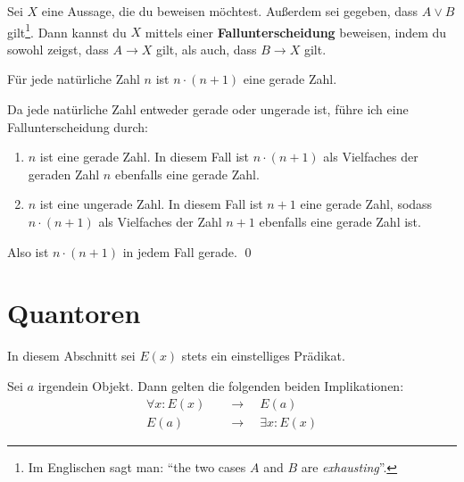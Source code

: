 \begin{axiom} \label{fallunterscheidung} 
    Sei $X$ eine Aussage, die du beweisen möchtest. Außerdem sei gegeben, dass $A\lor B$ gilt\footnote{Im Englischen sagt man: ``the two cases $A$ and $B$ are \emph{exhausting}''.}. Dann kannst du $X$ mittels einer \textbf{Fallunterscheidung} beweisen, indem du sowohl zeigst, dass $A\to X$ gilt, als auch, dass $B\to X$ gilt.
\end{axiom}


\begin{bsp} \label{bsp:fallunterscheidung}
    Für jede natürliche Zahl $n$ ist $n\cdot (n+1)$ eine gerade Zahl.
\end{bsp}


\begin{bew}
    Da jede natürliche Zahl entweder gerade oder ungerade ist, führe ich eine Fallunterscheidung durch:
    \begin{enumerate}[label={(Fall \arabic*):}, labelindent=1.5em, leftmargin=!, labelwidth=\widthof{(Fall 2):}]
        \item $n$ ist eine gerade Zahl. In diesem Fall ist $n\cdot (n+1)$ als Vielfaches der geraden Zahl $n$ ebenfalls eine gerade Zahl.
        \item $n$ ist eine ungerade Zahl. In diesem Fall ist $n+1$ eine gerade Zahl, sodass $n\cdot (n+1)$ als Vielfaches der Zahl $n+1$ ebenfalls eine gerade Zahl ist.
    \end{enumerate}
    Also ist $n\cdot(n+1)$ in jedem Fall gerade. \qed
\end{bew}





\section{Quantoren}


In diesem Abschnitt sei $E(x)$ stets ein einstelliges Prädikat.


\begin{axiom}[*] \label{quantorenaxiom}
    Sei $a$ irgendein Objekt. Dann gelten die folgenden beiden Implikationen:
    \begin{align*}
         \forall x: E(x) \quad& \to\quad E(a) \\
         E(a) \quad & \to\quad \exists x: E(x)
    \end{align*}
\end{axiom}

